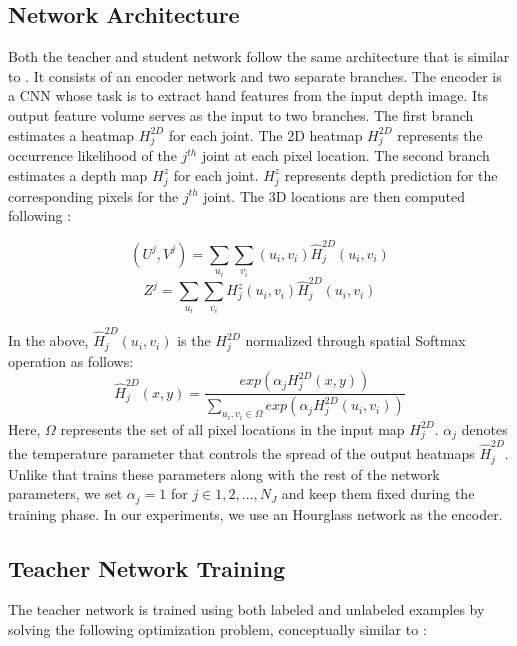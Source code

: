 \documentclass{article}
\begin{document}
\subsection{Network Architecture}
Both the teacher and student network follow the same architecture that is similar to \cite{iqbal2018hand}. It consists of an encoder network and two separate branches. The encoder is a CNN whose task is to extract hand features from the input depth image. Its output feature volume serves as the input to two branches. The first branch estimates a heatmap $H_j^{2D}$ for each joint.  The 2D heatmap $H_j^{2D}$ represents the occurrence likelihood of the $j^{th}$ joint at each pixel location. The second branch estimates a depth map $H_j^z$ for each joint. $H_j^z$ represents depth prediction for the corresponding pixels for the $j^{th}$ joint. The 3D locations are then computed following \cite{sun2018integral,iqbal2018hand}:

\begin{equation}
  (U^j,V^j) = \sum_{u_i}\sum_{v_i}(u_i,v_i){\hat{H}}_j^{2D}(u_i,v_i)
\end{equation}
\begin{equation}
  Z^j = \sum_{u_i}\sum_{v_i}H_j^z(u_i,v_i){\hat{H}}_j^{2D}(u_i,v_i)
\end{equation}

In the above, ${\hat{H}}_j^{2D}(u_i,v_i)$ is the $H_j^{2D}$ normalized through spatial Softmax operation as follows:
\begin{equation}
  {\hat{H}}_j^{2D}(x,y) = \frac{exp({\alpha}_j H_j^{2D}(x,y))}{\sum\limits_{u_i,v_i\in{\Omega}}exp({\alpha}_j H_j^{2D}(u_i,v_i))}
\end{equation}
Here, $\Omega$ represents the set of all pixel locations in the input map $H_j^{2D}$. ${\alpha}_j$ denotes the temperature parameter that controls the spread of the output heatmaps ${\hat{H}}_j^{2D}$. Unlike \cite{iqbal2018hand} that trains these parameters along with the rest of the network parameters, we set ${\alpha}_j = 1$ for $j \in{1,2,...,N_J}$ and keep them fixed during the training phase. In our experiments, we use an Hourglass network \cite{newell2016stacked} as the encoder.




\subsection{Teacher Network Training}
The teacher network is trained using both labeled and unlabeled examples by solving the following optimization problem, conceptually similar to \cite{xie2019unsupervised,yang2021semihand}:  
\end{document}
